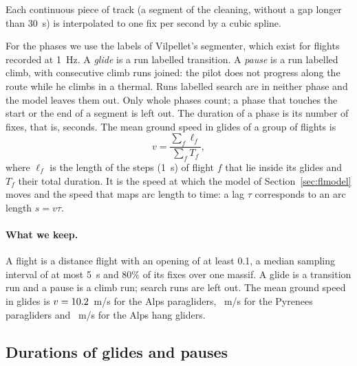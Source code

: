 \documentclass[11pt,a4paper]{article}
\begin{document}
Each continuous piece of track (a segment of the cleaning, without a gap longer than 30~s) is interpolated to
one fix per second by a cubic spline.

For the phases we use the labels of Vilpellet's segmenter, which exist for flights recorded at 1~Hz. A
\emph{glide} is a run labelled transition. A \emph{pause} is a run labelled climb, with consecutive climb runs joined: the pilot does not progress along the
route while he climbs in a thermal. Runs labelled search are in neither phase and the model leaves them out. Only
whole phases count; a phase that touches the start or the end of a segment is left out. The duration of a phase
is its number of fixes, that is, seconds. The mean ground speed in glides of a group of flights is
\begin{equation}
  v = \frac{\sum_f \ell_f}{\sum_f T_f},
  \label{eq:vglide}
\end{equation}
where $\ell_f$ is the length of the steps (1~s) of flight $f$ that lie inside its glides and $T_f$ their total
duration. It is the speed at which the model of Section~\ref{sec:flmodel} moves and the speed that maps arc
length to time: a lag $\tau$ corresponds to an arc length $s = v\tau$.

\begin{table}[t]
\centering
\caption{The 1~Hz flights of each group with their whole phases. \emph{flights}: those with phases;
\emph{glides} and \emph{pauses}: whole phases; $v$: Eq.~\eqref{eq:vglide} with its 95\% interval from the
bootstrap over flights. A group with fewer than \flMinFlights{} flights, or without phases, is not
interpreted.}
\label{tab:flphases}
\small

\end{table}

\paragraph{What we keep.} A flight is a distance flight with an opening of at least 0.1, a median sampling
interval of at most 5~s and 80\% of its fixes over one massif. A glide is a transition run and a pause is a
climb run; search runs are left out. The mean ground speed in glides is $v = 10.2$~m/s for the Alps
paragliders, \flVGlidePyrPara~m/s for the Pyrenees paragliders and \flVGlideAlpsHang~m/s for the Alps hang
gliders.


\subsection{Durations of glides and pauses}\label{sec:flphases}
\end{document}
